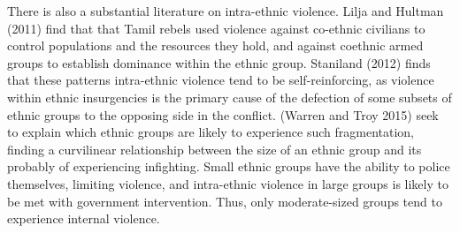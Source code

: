 \documentclass[12pt,]{article}
\begin{document}
There is also a substantial literature on intra-ethnic violence. Lilja
and Hultman (2011) find that that Tamil rebels used violence against
co-ethnic civilians to control populations and the resources they hold,
and against coethnic armed groups to establish dominance within the
ethnic group. Staniland (2012) finds that these patterns intra-ethnic
violence tend to be self-reinforcing, as violence within ethnic
insurgencies is the primary cause of the defection of some subsets of
ethnic groups to the opposing side in the conflict. (Warren and Troy
2015) seek to explain which ethnic groups are likely to experience such
fragmentation, finding a curvilinear relationship between the size of an
ethnic group and its probably of experiencing infighting. Small ethnic
groups have the ability to police themselves, limiting violence, and
intra-ethnic violence in large groups is likely to be met with
government intervention. Thus, only moderate-sized groups tend to
experience internal violence.
\end{document}
